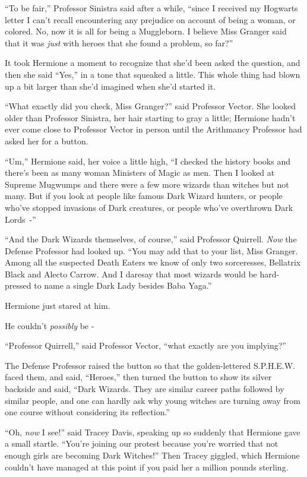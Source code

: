 ``To be fair,'' Professor Sinistra said after a while, ``since I received my Hogwarts letter I can't recall encountering any prejudice on account of being a woman, or colored. No, now it is all for being a Muggleborn. I believe Miss Granger said that it was \emph{just} with heroes that she found a problem, so far?''

It took Hermione a moment to recognize that she'd been asked the question, and then she said ``Yes,'' in a tone that squeaked a little. This whole thing had blown up a bit larger than she'd imagined when she'd started it.

``What exactly did you check, Miss Granger?'' said Professor Vector. She looked older than Professor Sinistra, her hair starting to gray a little; Hermione hadn't ever come close to Professor Vector in person until the Arithmancy Professor had asked her for a button.

``Um,'' Hermione said, her voice a little high, ``I checked the history books and there's been as many woman Ministers of Magic as men. Then I looked at Supreme Mugwumps and there were a few more wizards than witches but not many. But if you look at people like famous Dark Wizard hunters, or people who've stopped invasions of Dark creatures, or people who've overthrown Dark Lords~-''

``And the Dark Wizards themselves, of course,'' said Professor Quirrell. \emph{Now} the Defense Professor had looked up. ``You may add that to your list, Miss Granger. Among all the suspected Death Eaters we know of only two sorceresses, Bellatrix Black and Alecto Carrow. And I daresay that most wizards would be hard-pressed to name a single Dark Lady besides Baba Yaga.''

Hermione just stared at him.

He couldn't \emph{possibly} be -

``Professor Quirrell,'' said Professor Vector, ``what exactly are you implying?''

The Defense Professor raised the button so that the golden-lettered S.P.H.E.W. faced them, and said, ``Heroes,'' then turned the button to show its silver backside and said, ``Dark Wizards. They are similar career paths followed by similar people, and one can hardly ask why young witches are turning away from one course without considering its reflection.''

``Oh, \emph{now} I see!'' said Tracey Davis, speaking up so suddenly that Hermione gave a small startle. ``You're joining our protest because you're worried that not enough girls are becoming Dark Witches!'' Then Tracey giggled, which Hermione couldn't have managed at this point if you paid her a million pounds sterling.

